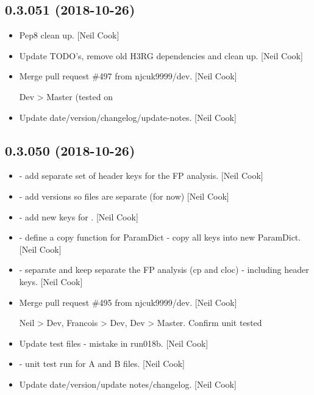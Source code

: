 \documentclass[a4paper,10pt,english]{report}
\begin{document}
\subsection{0.3.051 (2018-10-26)}
\label{\detokenize{misc/changelog:id280}}\begin{itemize}
\item {} 
Pep8 clean up. {[}Neil Cook{]}

\item {} 
Update TODO’s, remove old H3RG dependencies and clean up. {[}Neil Cook{]}

\item {} 
Merge pull request \#497 from njcuk9999/dev. {[}Neil Cook{]}

Dev \textendash{}\textgreater{} Master (tested on 

\item {} 
Update date/version/changelog/update-notes. {[}Neil Cook{]}

\end{itemize}


\subsection{0.3.050 (2018-10-26)}
\label{\detokenize{misc/changelog:id281}}\begin{itemize}
\item {} 
 - add separate set of header keys for the FP
analysis. {[}Neil Cook{]}

\item {} 
 - add  versions so files are separate (for now)
{[}Neil Cook{]}

\item {} 
 - add new keys for . {[}Neil Cook{]}

\item {} 
 - define a copy function for ParamDict - copy all keys
into new ParamDict. {[}Neil Cook{]}

\item {} 
 - separate and keep separate the FP analysis
(cp and cloc) - including header keys. {[}Neil Cook{]}

\item {} 
Merge pull request \#495 from njcuk9999/dev. {[}Neil Cook{]}

Neil \textendash{}\textgreater{} Dev, Francois \textendash{}\textgreater{} Dev, Dev \textendash{}\textgreater{} Master. Confirm unit tested

\item {} 
Update test files - mistake in run018b. {[}Neil Cook{]}

\item {} 
 - unit test run for A and B files. {[}Neil Cook{]}

\item {} 
Update date/version/update notes/changelog. {[}Neil Cook{]}

\end{itemize}
\end{document}
